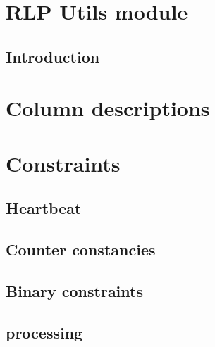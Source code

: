 
\section{RLP Utils module}
\subsection{Introduction}                
\section{Column descriptions}            \label{rlputils: column descriptions}             

\section{Constraints}
\subsection{Heartbeat}                   
\subsection{Counter constancies}        
\subsection{Binary constraints}         
\subsection{ processing}         
